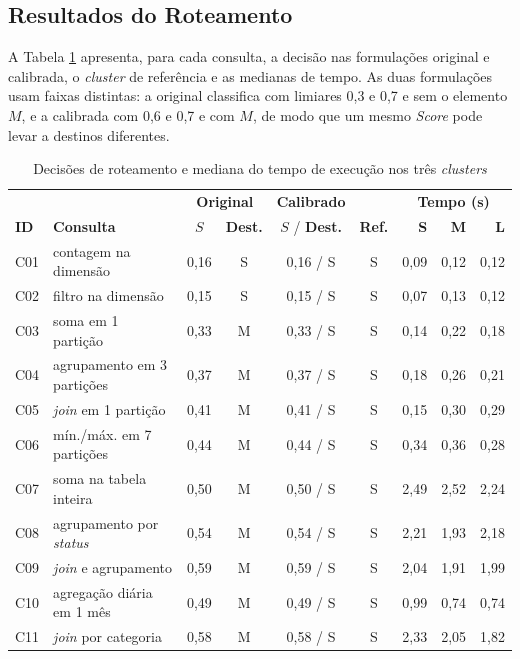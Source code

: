 \subsection{Resultados do Roteamento}

A Tabela \ref{tab:benchmark} apresenta, para cada consulta, a decisão nas formulações original e calibrada, o \textit{cluster} de referência e as medianas de tempo. As duas formulações usam faixas distintas: a original classifica com limiares 0,3 e 0,7 e sem o elemento $M$, e a calibrada com 0,6 e 0,7 e com $M$, de modo que um mesmo \textit{Score} pode levar a destinos diferentes.

\begin{table}[H]
	\centering
	\caption{Decisões de roteamento e mediana do tempo de execução nos três \textit{clusters}}
	\label{tab:benchmark}
	\footnotesize
	\begin{tabular}{llccccrrr}
	\hline
	& & \multicolumn{2}{c}{\textbf{Original}} & \textbf{Calibrado} & & \multicolumn{3}{c}{\textbf{Tempo (s)}} \\
	\textbf{ID} & \textbf{Consulta} & $S$ & \textbf{Dest.} & $S$ / \textbf{Dest.} & \textbf{Ref.} & \textbf{S} & \textbf{M} & \textbf{L} \\
	\hline
	C01 & contagem na dimensão & 0,16 & S & 0,16 / S & S & 0,09 & 0,12 & 0,12 \\
	C02 & filtro na dimensão & 0,15 & S & 0,15 / S & S & 0,07 & 0,13 & 0,12 \\
	C03 & soma em 1 partição & 0,33 & M & 0,33 / S & S & 0,14 & 0,22 & 0,18 \\
	C04 & agrupamento em 3 partições & 0,37 & M & 0,37 / S & S & 0,18 & 0,26 & 0,21 \\
	C05 & \textit{join} em 1 partição & 0,41 & M & 0,41 / S & S & 0,15 & 0,30 & 0,29 \\
	C06 & mín./máx. em 7 partições & 0,44 & M & 0,44 / S & S & 0,34 & 0,36 & 0,28 \\
	C07 & soma na tabela inteira & 0,50 & M & 0,50 / S & S & 2,49 & 2,52 & 2,24 \\
	C08 & agrupamento por \textit{status} & 0,54 & M & 0,54 / S & S & 2,21 & 1,93 & 2,18 \\
	C09 & \textit{join} e agrupamento & 0,59 & M & 0,59 / S & S & 2,04 & 1,91 & 1,99 \\
	C10 & agregação diária em 1 mês & 0,49 & M & 0,49 / S & S & 0,99 & 0,74 & 0,74 \\
	C11 & \textit{join} por categoria & 0,58 & M & 0,58 / S & S & 2,33 & 2,05 & 1,82 \\

\end{tabular}
\end{table}
